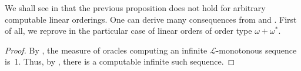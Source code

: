 \documentclass{article}
\numberwithin{theorem}{section}
\newtheorem{corollary}[theorem]{Corollary}
\newcommand{\ludovic}[1]{\textcolor{blue}{#1}}
\def\L{\mathcal{L}}
\def\M{\mathcal{M}}
\newcommand{\RCA}[0]{\mathsf{RCA}}
\newcommand{\ADS}[0]{\mathsf{ADS}}
\newcommand{\SepRT}[0]{\mathsf{Sep}\mbox{-}\mathsf{RT}}
\newcommand{\NN}[0]{\mathbb{N}}
\begin{document}




We shall see in  that the previous proposition does not hold for arbitrary computable linear orderings.
One can derive many consequences from  and .
First of all, we reprove  in the particular case of linear orders of order type $\omega + \omega^*$.

\begin{proof}
By , the measure of oracles computing an infinite $\L$-monoto\-nous sequence is~1. Thus, by , there is a computable infinite such sequence.
\end{proof}


\end{document}
